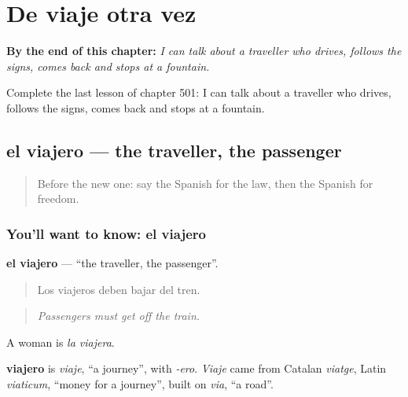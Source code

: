 
\chapter{De viaje otra vez}
\label{ch:es-de-viaje-otra-vez}

\begin{chapteropening}
\textbf{By the end of this chapter:} \emph{I can talk about a traveller who drives, follows the signs, comes back and stops at a fountain.}

Complete the last lesson of chapter 501: I can talk about a traveller who drives, follows the signs, comes back and stops at a fountain.
\end{chapteropening}

\section[el viajero]{el viajero — the traveller, the passenger}

\label{lesson:ES-C501-viajero}



\begin{quote}
Before the new one: say the Spanish for the law, then the Spanish for freedom.
\end{quote}

\subsection*{You'll want to know: el viajero}
\textbf{el viajero} — \textquotedblleft{}the traveller, the passenger\textquotedblright{}.

\begin{quote}
Los viajeros deben bajar del tren.
\end{quote}

\begin{quote}
\emph{Passengers must get off the train.}
\end{quote}

A woman is \emph{la viajera}.

\begin{cousinweb}
\textbf{viajero} is \emph{viaje}, \textquotedblleft{}a journey\textquotedblright{}, with \emph{-ero}. \emph{Viaje} came from Catalan \emph{viatge}, Latin \emph{viaticum}, \textquotedblleft{}money for a journey\textquotedblright{}, built on \emph{via}, \textquotedblleft{}a road\textquotedblright{}.
\end{cousinweb}


